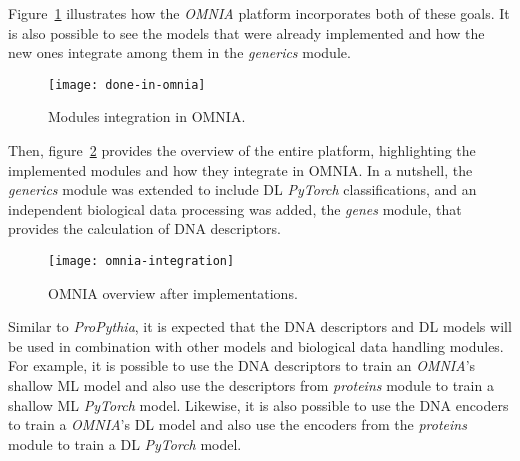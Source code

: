 Figure~\ref{fig:done-in-omnia} illustrates how the \textit{OMNIA} platform incorporates both of these goals. It is also possible to see the models that were already implemented and how the new ones integrate among them in the \textit{generics} module.

\begin{figure}[htbp]
    \centering
    \texttt{[image: done-in-omnia]}
    \caption{Modules integration in OMNIA.}
    \label{fig:done-in-omnia}
\end{figure}

Then, figure~\ref{fig:omnia-integration} provides the overview of the entire platform, highlighting the implemented modules and how they integrate in OMNIA. In a nutshell, the \textit{generics} module was extended to include \gls{DL} \textit{PyTorch} classifications, and an independent biological data processing was added, the \textit{genes} module, that provides the calculation of \gls{DNA} descriptors.

\begin{figure}[htbp]
    \centering
    \texttt{[image: omnia-integration]}
    \caption{OMNIA overview after implementations.}
    \label{fig:omnia-integration}
\end{figure}

Similar to \textit{ProPythia}, it is expected that the \gls{DNA} descriptors and \gls{DL} models will be used in combination with other models and biological data handling modules. For example, it is possible to use the \gls{DNA} descriptors to train an \textit{OMNIA}'s shallow \gls{ML} model and also use the descriptors from \textit{proteins} module to train a shallow \gls{ML} \textit{PyTorch} model. Likewise, it is also possible to use the \gls{DNA} encoders to train a \textit{OMNIA}'s \gls{DL} model and also use the encoders from the \textit{proteins} module to train a \gls{DL} \textit{PyTorch} model.